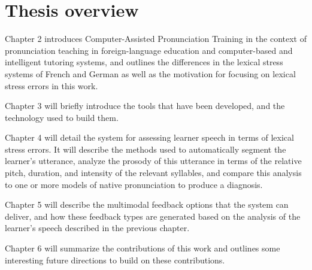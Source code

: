 \section{Thesis overview}
\label{sec:intro:overview}

{\thesisparagraphfont Chapter 2} introduces Computer-Assisted Pronunciation Training in the context of pronunciation teaching in foreign-language education and computer-based and intelligent tutoring systems, and outlines the differences in the lexical stress systems of French and German as well as the motivation for focusing on lexical stress errors in this work.


{\thesisparagraphfont Chapter 3} will briefly introduce the tools that have been developed, and the technology used to build them.

{\thesisparagraphfont Chapter 4} will detail the system for assessing learner speech in terms of lexical stress errors. It will describe the methods used to automatically segment the learner's utterance, analyze the prosody of this utterance in terms of the relative pitch, duration, and intensity of the relevant syllables, and compare this analysis to one or more models of native pronunciation to produce a diagnosis.

{\thesisparagraphfont Chapter 5} will describe the multimodal feedback options that the system can deliver, and how these feedback types are generated based on the analysis of the learner's speech described in the previous chapter. 

{\thesisparagraphfont Chapter 6} will summarize the contributions of this work and outlines some interesting future directions to build on these contributions.



